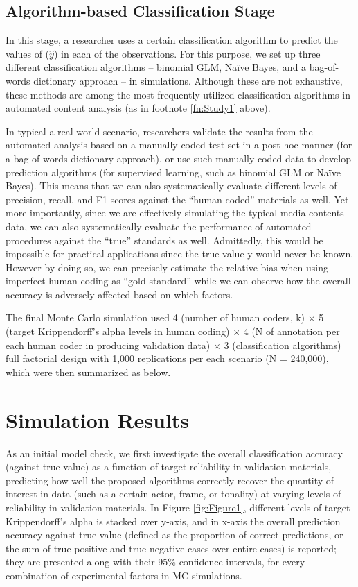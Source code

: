 \documentclass[man, 12pt, a4paper, nolmodern, noextraspace]{apa6}
\begin{document}
    \subsection{Algorithm-based Classification Stage}
    
    In this stage, a researcher uses a certain classification algorithm to predict the values of ($\hat{y}$) in each of the observations. For this purpose, we set up three different classification algorithms – binomial GLM, Naïve Bayes, and a bag-of-words dictionary approach -- in simulations. Although these are not exhaustive, these methods are among the most frequently utilized classification algorithms in automated content analysis (as in footnote \ref{fn:Study1} above). 
    
    In typical a real-world scenario, researchers validate the results from the automated analysis based on a manually coded test set in a post-hoc manner (for a bag-of-words dictionary approach), or use such manually coded data to develop prediction algorithms (for supervised learning, such as binomial GLM or Naïve Bayes). This means that we can also systematically evaluate different levels of precision, recall, and F1 scores against the \enquote{human-coded} materials as well. Yet more importantly, since we are effectively simulating the typical media contents data, we can also systematically evaluate the performance of automated procedures against the \enquote{true} standards as well. Admittedly, this would be impossible for practical applications since the true value y would never be known. However by doing so, we can precisely estimate the relative bias when using imperfect human coding as \enquote{gold standard} while we can observe how the overall accuracy is adversely affected based on which factors. 
    
    The final Monte Carlo simulation used 4 (number of human coders, k) $\times$ 5 (target Krippendorff's alpha levels in human coding) $\times$ 4 (N of annotation per each human coder in producing validation data) $\times$ 3 (classification algorithms) full factorial design with 1,000 replications per each scenario (N = 240,000), which were then summarized as below.
    
\section{Simulation Results}

    As an initial model check, we first investigate the overall classification accuracy (against true value) as a function of target reliability in validation materials, predicting how well the proposed algorithms correctly recover the quantity of interest in data (such as a certain actor, frame, or tonality) at varying levels of reliability in validation materials. In Figure \ref{fig:Figure1}, different levels of target Krippendorff's alpha is stacked over y-axis, and in x-axis the overall prediction accuracy against true value (defined as the proportion of correct predictions, or the sum of true positive and true negative cases over entire cases) is reported; they are presented along with their 95\% confidence intervals, for every combination of experimental factors in MC simulations.
\end{document}
